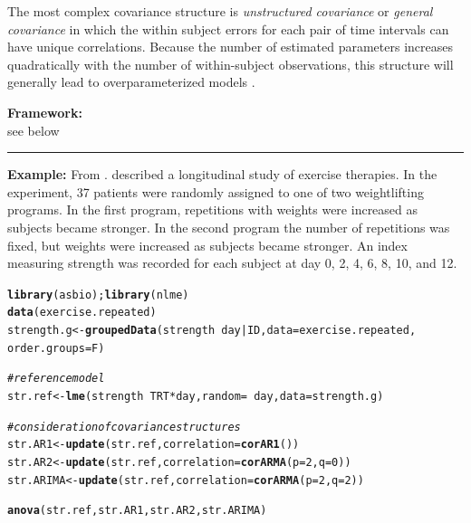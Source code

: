 \documentclass[12pt,english]{article}\usepackage[]{graphicx}\usepackage[table]{xcolor}
\makeatletter
\newcommand{\hlnum}[1]{\textcolor[rgb]{0.686,0.059,0.569}{#1}}%
\newcommand{\hlcom}[1]{\textcolor[rgb]{0.678,0.584,0.686}{\textit{#1}}}%
\newcommand{\hlopt}[1]{\textcolor[rgb]{0,0,0}{#1}}%
\newcommand{\hldef}[1]{\textcolor[rgb]{0.345,0.345,0.345}{#1}}%
\newcommand{\hlkwb}[1]{\textcolor[rgb]{0.69,0.353,0.396}{#1}}%
\newcommand{\hlkwc}[1]{\textcolor[rgb]{0.333,0.667,0.333}{#1}}%
\newcommand{\hlkwd}[1]{\textcolor[rgb]{0.737,0.353,0.396}{\textbf{#1}}}%
\newenvironment{kframe}{%
 \def\at@end@of@kframe{}%
 \ifinner\ifhmode%
  \def\at@end@of@kframe{\end{minipage}}%
  \begin{minipage}{\columnwidth}%
 \fi\fi%
 \def\FrameCommand##1{\hskip\@totalleftmargin \hskip-\fboxsep
 \colorbox{shadecolor}{##1}\hskip-\fboxsep
     \hskip-\linewidth \hskip-\@totalleftmargin \hskip\columnwidth}%
 \MakeFramed {\advance\hsize-\width
   \@totalleftmargin\z@ \linewidth\hsize
   \@setminipage}}%
 {\par\unskip\endMakeFramed%
 \at@end@of@kframe}
\newenvironment{knitrout}{}{} %
\makeatother
\begin{document}
The most complex covariance structure is \textit{unstructured covariance} or \textit{general covariance} in which the within subject errors for each pair of time intervals can have unique correlations. Because the number of estimated parameters increases quadratically with the number of within-subject observations, this structure will generally lead to overparameterized models \citep{pinheiro2009}.


\vspace{0.1in}

\begin{tcolorbox}[colback=yellow!50!red!25!white,colbacktitle=yellow!50!red,colframe=black!75!white,title=\textbf{R:} Mixed Model Approach to Repeated Measures]

\textbf{Framework:}\\
see below
\vspace{0.1in}
\par\noindent\rule{.9\textwidth}{0.4pt}

\textbf{Example:} From \citet[][pg. 483]{aho2014}. \citet{fitz2012} described a longitudinal study of exercise therapies. In the experiment, 37 patients were randomly assigned to one of two weightlifting programs. In the first program, repetitions with weights were increased as subjects became stronger. In the second program the number of repetitions was fixed, but weights were increased as subjects became stronger. An index measuring strength was recorded for each subject at day 0, 2, 4, 6, 8, 10, and 12.

\vspace{-.1in}
\begin{knitrout}
\color{fgcolor}\begin{kframe}
\begin{alltt}
\hlkwd{library}\hldef{(asbio);} \hlkwd{library}\hldef{(nlme)}
\hlkwd{data}\hldef{(exercise.repeated)}
\hldef{strength.g} \hlkwb{<-} \hlkwd{groupedData}\hldef{(strength} \hlopt{~} \hldef{day}\hlopt{|}\hldef{ID,} \hlkwc{data} \hldef{= exercise.repeated,}
                          \hlkwc{order.groups} \hldef{= F)}

\hlcom{# reference model}
\hldef{str.ref} \hlkwb{<-} \hlkwd{lme}\hldef{(strength} \hlopt{~} \hldef{TRT} \hlopt{*} \hldef{day,} \hlkwc{random} \hldef{=} \hlopt{~}\hldef{day,} \hlkwc{data} \hldef{= strength.g)}

\hlcom{# consideration of covariance structures}
\hldef{str.AR1} \hlkwb{<-} \hlkwd{update}\hldef{(str.ref,} \hlkwc{correlation} \hldef{=} \hlkwd{corAR1}\hldef{())}
\hldef{str.AR2} \hlkwb{<-} \hlkwd{update}\hldef{(str.ref,} \hlkwc{correlation} \hldef{=} \hlkwd{corARMA}\hldef{(}\hlkwc{p} \hldef{=} \hlnum{2}\hldef{,} \hlkwc{q} \hldef{=} \hlnum{0}\hldef{))}
\hldef{str.ARIMA} \hlkwb{<-} \hlkwd{update}\hldef{(str.ref,} \hlkwc{correlation} \hldef{=} \hlkwd{corARMA}\hldef{(}\hlkwc{p} \hldef{=} \hlnum{2}\hldef{,} \hlkwc{q} \hldef{=} \hlnum{2}\hldef{))}

\hlkwd{anova}\hldef{(str.ref, str.AR1, str.AR2, str.ARIMA)}
\end{alltt}
\end{kframe}
\end{knitrout}
\end{tcolorbox}
\end{document}
